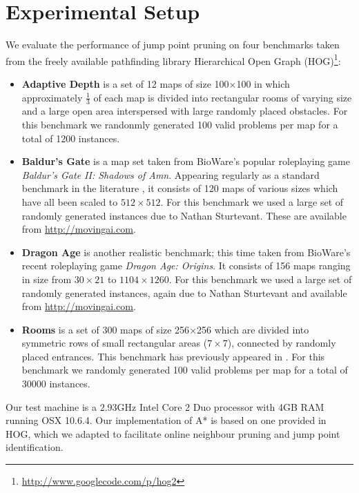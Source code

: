 \section{Experimental Setup}
We evaluate the performance of jump point pruning on four benchmarks taken from the freely
available pathfinding library Hierarchical Open Graph
(HOG)\footnote{\url{http://www.googlecode.com/p/hog2}}: 
\begin{itemize}

\item{\textbf{Adaptive Depth}
is a set of 12 maps of size 100$\times$100 in which approximately $\frac{1}{3}$
of each map is divided into rectangular rooms of varying size and a large
open area interspersed with large randomly placed obstacles.
For this benchmark we randonmly generated 100 valid problems per map for a 
total of 1200 instances.
} 

\item{\textbf{Baldur's Gate} is a map set taken from BioWare's popular
roleplaying game \emph{Baldur's Gate II: Shadows of Amn}.
Appearing regularly as a standard benchmark in the literature
\cite{bjornsson06,harabor10,pochter10}, 
it consists of 120 maps of various sizes which have all been scaled to
$512\times512$. 
For this benchmark we used a large set of randomly generated instances due to
Nathan Sturtevant. These are available from \url{http://movingai.com}.
}

\item{\textbf{Dragon Age} is another realistic benchmark; this time taken from
BioWare's recent roleplaying game \emph{Dragon Age: Origins}.
It consists of 156 maps ranging in size 
from $30\times21$ to $1104\times1260$.
For this benchmark we used a large set of randomly generated instances,
again due to Nathan Sturtevant and available from \url{http://movingai.com}.
}

\item{\textbf{Rooms} is a set of 300 maps of size
256$\times$256 which are divided into symmetric rows of small rectangular areas
($7\times7$), connected by randomly placed entrances. This benchmark has
previously appeared in \cite{pochter10}.
For this benchmark we randomly generated 100 valid problems per map for a 
total of 30000 instances.
}
\end{itemize}

Our test machine is a 2.93GHz Intel Core 2 Duo processor with 4GB RAM running OSX 
10.6.4.  Our implementation of A* is based on one provided in HOG, which we 
adapted to facilitate online neighbour pruning and jump point identification. 
